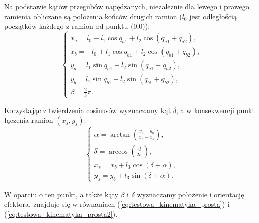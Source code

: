 \documentclass[printmode]{mgr}
\begin{document}
Na podstawie kątów przegubów napędzanych, niezależnie dla lewego i prawego ramienia obliczane są położenia końców drugich ramion
($l_0$ jest odległością początków każdego z ramion od punktu (0,0)):
\begin{equation}
\begin{cases}
x_a = l_0 + l_1\cos q_{a1} + l_2 \cos(q_{a1}+q_{a2}),\\
x_b = -l_0 + l_1\cos q_{b1} + l_2 \cos(q_{b1}+q_{b2}),\\
y_a = l_1\sin q_{a1} + l_2 \sin(q_{a1}+q_{a2}),\\
y_b = l_1\sin q_{b1} + l_2 \sin(q_{b1}+q_{b2}),\\
\beta = \frac{2}{3}\pi.
\end{cases}
\label{eq:testowa_kinematyka_prosta2}
\end{equation}

Korzystając z twierdzenia cosinusów wyznaczamy kąt $\delta$, a w konsekwencji punkt łączenia ramion $(x_s, y_s)$:
\begin{equation}
\begin{cases}
\alpha = \arctan(\frac{y_a-y_b}{x_a-x_b}),\\
\delta = \arccos(\frac{d}{2l_3}),\\
x_s = x_b + l_3\cos(\delta + \alpha),\\
y_s = y_b + l_3\sin(\delta + \alpha).
\end{cases}
\label{eq:testowa_kinematyka_prosta3}
\end{equation}

W oparciu o ten punkt, a także kąty $\beta$ i $\delta$ wyznaczamy położenie i orientację efektora.
znajduje się w równaniach (\ref{eq:testowa_kinematyka_prosta}) i (\ref{eq:testowa_kinematyka_prosta2}).
\end{document}
